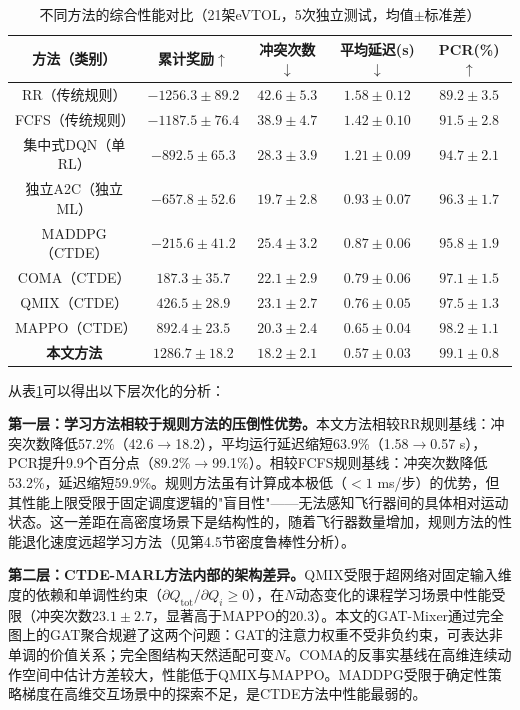 \documentclass[12pt,a4paper,UTF8]{ctexart}
\begin{document}
\begin{table}[H]
    \centering
    \caption{不同方法的综合性能对比（21架eVTOL，5次独立测试，均值$\pm$标准差）}
    \label{tab:comparison}
    \begin{tabular}{|c|c|c|c|c|}
        \hline
        \textbf{方法（类别）} & \textbf{累计奖励$\uparrow$} & \textbf{冲突次数$\downarrow$} & \textbf{平均延迟(s)$\downarrow$} & \textbf{PCR(\%)$\uparrow$} \\
        \hline
        RR（传统规则） & $-1256.3 \pm 89.2$ & $42.6 \pm 5.3$ & $1.58 \pm 0.12$ & $89.2 \pm 3.5$ \\
        FCFS（传统规则） & $-1187.5 \pm 76.4$ & $38.9 \pm 4.7$ & $1.42 \pm 0.10$ & $91.5 \pm 2.8$ \\
        集中式DQN（单RL） & $-892.5 \pm 65.3$ & $28.3 \pm 3.9$ & $1.21 \pm 0.09$ & $94.7 \pm 2.1$ \\
        独立A2C（独立ML） & $-657.8 \pm 52.6$ & $19.7 \pm 2.8$ & $0.93 \pm 0.07$ & $96.3 \pm 1.7$ \\
        MADDPG（CTDE） & $-215.6 \pm 41.2$ & $25.4 \pm 3.2$ & $0.87 \pm 0.06$ & $95.8 \pm 1.9$ \\
        COMA（CTDE） & $187.3 \pm 35.7$ & $22.1 \pm 2.9$ & $0.79 \pm 0.06$ & $97.1 \pm 1.5$ \\
        QMIX（CTDE） & $426.5 \pm 28.9$ & $23.1 \pm 2.7$ & $0.76 \pm 0.05$ & $97.5 \pm 1.3$ \\
        MAPPO（CTDE） & $892.4 \pm 23.5$ & $20.3 \pm 2.4$ & $0.65 \pm 0.04$ & $98.2 \pm 1.1$ \\
        \textbf{本文方法} & $\mathbf{1286.7 \pm 18.2}$ & $\mathbf{18.2 \pm 2.1}$ & $\mathbf{0.57 \pm 0.03}$ & $\mathbf{99.1 \pm 0.8}$ \\
        \hline
    \end{tabular}
\end{table}

从表\ref{tab:comparison}可以得出以下层次化的分析：

\textbf{第一层：学习方法相较于规则方法的压倒性优势。}本文方法相较RR规则基线：冲突次数降低57.2\%（42.6$\to$18.2），平均运行延迟缩短63.9\%（1.58$\to$0.57 s），PCR提升9.9个百分点（89.2\%$\to$99.1\%）。相较FCFS规则基线：冲突次数降低53.2\%，延迟缩短59.9\%。规则方法虽有计算成本极低（$<1$ ms/步）的优势，但其性能上限受限于固定调度逻辑的"盲目性"——无法感知飞行器间的具体相对运动状态。这一差距在高密度场景下是结构性的，随着飞行器数量增加，规则方法的性能退化速度远超学习方法（见第4.5节密度鲁棒性分析）。

\textbf{第二层：CTDE-MARL方法内部的架构差异。}QMIX受限于超网络对固定输入维度的依赖和单调性约束（$\partial Q_{\text{tot}} / \partial Q_i \geq 0$），在$N$动态变化的课程学习场景中性能受限（冲突次数$23.1 \pm 2.7$，显著高于MAPPO的$20.3$）。本文的GAT-Mixer通过完全图上的GAT聚合规避了这两个问题：GAT的注意力权重不受非负约束，可表达非单调的价值关系；完全图结构天然适配可变$N$。COMA的反事实基线在高维连续动作空间中估计方差较大，性能低于QMIX与MAPPO。MADDPG受限于确定性策略梯度在高维交互场景中的探索不足，是CTDE方法中性能最弱的。
\end{document}
